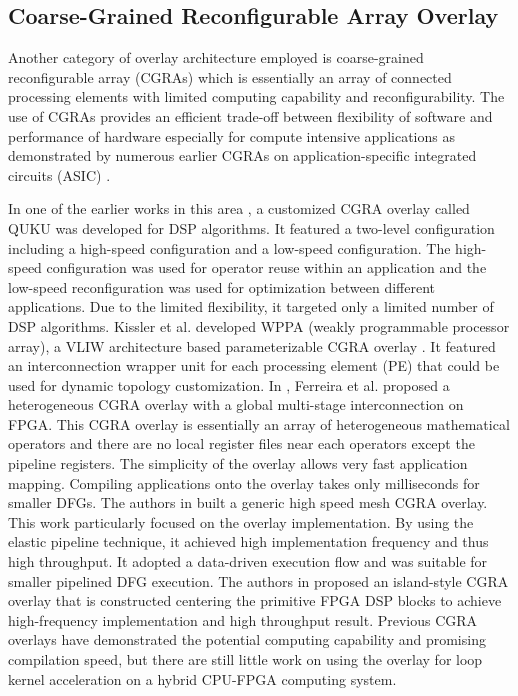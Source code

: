 \subsection{Coarse-Grained Reconfigurable Array Overlay}
Another category of overlay architecture employed is coarse-grained reconfigurable array (CGRAs) \cite{ferreira2011fpga, kissler2006dynamically, shukla2006quku, lin2012energy, capalijia2013pipelined} which is essentially an array of connected processing elements with limited computing capability and reconfigurability. The use of CGRAs provides an efficient trade-off between flexibility of software and performance of hardware especially for compute intensive applications as demonstrated by numerous earlier CGRAs on application-specific integrated circuits (ASIC) \cite{tessier2001reconfigurable, compton2002reconfigurable}.

In one of the earlier works in this area \cite{shukla2006quku}, a customized CGRA overlay called QUKU was developed for DSP algorithms. It featured a two-level configuration including a high-speed configuration and a low-speed configuration. The high-speed configuration was used for operator reuse within an application and the low-speed reconfiguration was used for optimization between different applications. Due to the limited flexibility, it targeted only a limited number of DSP algorithms. Kissler et al. developed WPPA (weakly programmable processor array), a VLIW architecture based parameterizable CGRA overlay \cite{kissler2006dynamically}. It featured an interconnection wrapper unit for each processing element (PE) that could be used for dynamic topology customization. In \cite{ferreira2011fpga}, Ferreira et al. proposed a heterogeneous CGRA overlay with a global multi-stage interconnection on FPGA. This CGRA overlay is essentially an array of heterogeneous mathematical operators and there are no local register files near each operators except the pipeline registers. The simplicity of the overlay allows very fast application mapping. Compiling applications onto the overlay takes only milliseconds for smaller DFGs. The authors in \cite{capalijia2013pipelined} built a generic high speed mesh CGRA overlay. This work particularly focused on the overlay implementation. By using the elastic pipeline technique, it achieved high implementation frequency and thus high throughput. It adopted a data-driven execution flow and was suitable for smaller pipelined DFG execution. The authors in \cite{jain2015efficient} proposed an island-style CGRA overlay that is constructed centering the primitive FPGA DSP blocks to achieve high-frequency implementation and high throughput result. Previous CGRA overlays have demonstrated the potential computing capability and promising compilation speed, but there are still little work on using the overlay for loop kernel acceleration on a hybrid CPU-FPGA computing system. 

